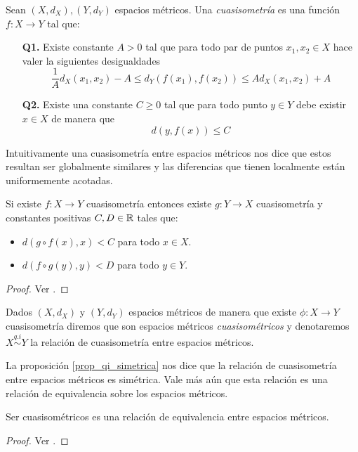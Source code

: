 \documentclass[tesis.tex]{subfiles}
\begin{document}
\begin{deff}
	Sean $(X,d_X),(Y,d_Y)$ espacios métricos. 
	Una \emph{cuasisometría} es una función $f:X \to Y$ tal que:
	\begin{itemize}
		\item[\textbf{Q1.}] Existe constante $A > 0$ tal que para todo par de puntos $x_1,x_2 \in X$ hace valer la siguientes desigualdades
		\[
		\frac{1}{A} d_X(x_1,x_2) - A \le d_Y(f(x_1),f(x_2)) \le A d_X(x_1,x_2) + A
		\]
		\item[\textbf{Q2.}] Existe una constante $C \ge 0$ tal que para todo punto $y \in Y$ debe existir $x \in X$ de manera que 
		\[
		d(y,f(x)) \le C
		\]
	\end{itemize}
\end{deff}

Intuitivamente una cuasisometría entre espacios métricos nos dice que estos resultan ser globalmente similares y las diferencias que tienen localmente están uniformemente acotadas. 

\medskip
\begin{prop}\label{prop_qi_simetrica}
	Si existe $f:X \to Y$ cuasisometría entonces existe $g:Y \to X$ cuasisometría 
	y constantes positivas $C,D \in \mathbb{R}$ tales que:
	\begin{itemize}
		\item $d(g \circ f (x), x) < C$ para todo $x \in X$.
		\item $d(f \circ g (y), y) < D$ para todo $y \in Y$. 
	\end{itemize}
\end{prop}
\begin{proof}
	Ver \cite{loh2017geometric}.
\end{proof}


\begin{deff}
	Dados $(X,d_{X})$ y $(Y,d_{Y})$ espacios métricos de manera que existe $\phi:X \to Y$ cuasisometría diremos que son espacios métricos \emph{cuasisométricos} y denotaremos $X \overset{q.i}{\sim} Y$ la relación de cuasisometría entre espacios métricos.
\end{deff}

La proposición \ref{prop_qi_simetrica} nos dice que la relación de cuasisometría entre espacios métricos es simétrica. 
Vale más aún que esta relación es una relación de equivalencia sobre los espacios métricos.

\begin{prop}
	Ser cuasisométricos es una relación de equivalencia entre espacios métricos.
\end{prop}
\begin{proof}
	Ver \cite{loh2017geometric}.
\end{proof}
\end{document}
